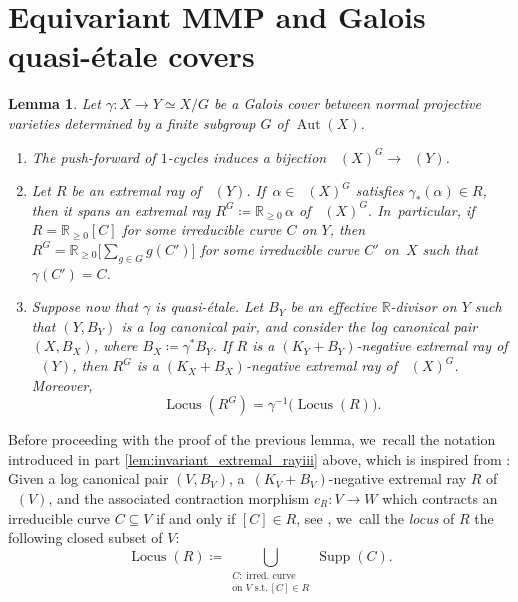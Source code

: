 \documentclass[JEP,XML,SOM,Unicode,published]{cedram}
\theoremstyle{plain}
\newtheorem{lem}[thm]{Lemma}
\theoremstyle{definition}
\newcommand{\R}{\mathbb{R}}
\DeclareMathOperator{\Supp}{Supp}
\DeclareMathOperator{\Aut}{Aut}
\DeclareMathOperator{\Locus}{Locus}
\DeclareMathOperator{\NEb}{\overline{\mathrm{NE}}}
\begin{document}
\section{Equivariant MMP and Galois quasi-étale covers}
\label{section:MMP}

\begin{lem}
\label{lem:invariant_extremal_ray}
Let $\gamma \colon X\to Y \simeq X/G$ be a Galois cover between normal projective varieties determined by a finite subgroup $G$ of $\Aut(X)$.
\begin{enumerate}
\item\label{lem:invariant_extremal_rayi}
The push-forward of $1$\nobreakdash-cycles induces a bijection $\NEb(X)^G \to \NEb(Y)$.

\item\label{lem:invariant_extremal_rayii}
Let $R$ be an extremal ray of $\NEb(Y)$. If~$\alpha \in \NEb(X)^G$ satisfies $\gamma_*(\alpha) \in R$, then it spans an extremal ray $R^G \coloneqq \R_{\geq 0} \,\alpha$ of $\NEb(X)^G$. In~particular, if $R = \R_{\geq 0} [C]$ for some irreducible curve $C$ on $Y$, then $R^G = \R_{\geq 0} \big[ \sum_{g\in G} g(C') \big]$ for some irreducible curve $C'$ on~$X$ such that $\gamma(C') = C$.

\item\label{lem:invariant_extremal_rayiii}
Suppose now that $\gamma$ is quasi-étale. Let $B_Y$ be an effective $\R$\nobreakdash-divisor on $Y$ such that $(Y, B_Y)$ is a log canonical pair, and consider the log canonical pair $(X,B_X)$, where $B_X \coloneqq \gamma^* B_Y$.
If $R$ is a $(K_Y+B_Y)$-negative extremal ray of $\NEb(Y)$, then $R^G$ is a $(K_X+B_X)$-negative extremal ray of $\NEb(X)^G$.
Moreover,
\[
\Locus \left(R^G \right) = \gamma^{-1} \bigl(\Locus(R) \bigr).
\]
\end{enumerate}
\end{lem}

Before proceeding with the proof of the previous lemma, we~recall the notation introduced in part \eqref{lem:invariant_extremal_rayiii} above, which is inspired from \cite[\S 6.5, p.\ 154]{Debarre01book}: Given a log canonical pair $(V,B_V)$, a~$(K_V+B_V)$-negative extremal ray $R$ of $\NEb(V)$, and the associated contraction morphism $c_R \colon V \to W$ which contracts an irreducible curve $C \subseteq V$ if and only if $[C] \in R$, see \cite[Th.\,4.5.2]{Fuj17book}, we~call the \emph{locus} of $R$ the following closed subset of $V$:
\[
\Locus(R) \coloneqq \bigcup_{\substack{C: \; \textrm{irred. curve} \\[0.1em] \textrm{on $V$ s.t.} \,[C] \in R}} \Supp(C).
\]
\end{document}
